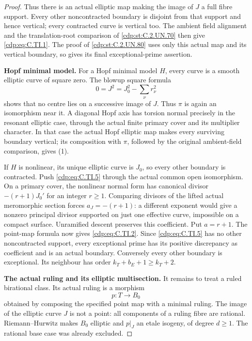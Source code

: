 \begin{proof}
Thus there is an actual elliptic map making
the image of \(J\) a full fibre support.
Every other noncontracted boundary is disjoint
from that support and hence vertical; every
contracted curve is vertical too. The ambient
field alignment and the translation-root
comparison of \ref{cdp:st:C.2.UN.70} then give \eqref{cdp:eq:C.TI.1}.
The proof of \ref{cdp:st:C.2.UN.80} uses only this actual map
and its vertical boundary, so gives its final
exceptional-prime assertion.

\par\medskip\noindent\textbf{Hopf minimal model.}
For a Hopf minimal model \(H\), every curve
is a smooth elliptic curve of square zero.
The blowup square formula
\[
                  0=J^2=J_0^2-\sum_\nu r_\nu^2
 \tag{C.TI.8}\label{cdp:eq:C.TI.8}
\]
shows that no centre lies on a successive
image of \(J\). Thus \(\pi\) is again an
isomorphism near it. A diagonal Hopf axis
has torsion normal precisely in the resonant
elliptic case, through the actual finite
primary cover and its multiplier character.
In that case the actual Hopf elliptic map
makes every surviving boundary vertical;
its composition with \(\pi\), followed by
the original ambient-field comparison,
gives (1).

If \(H\) is nonlinear, its unique elliptic
curve is \(J_0\), so every other boundary
is contracted. Push \eqref{cdp:eq:C.TI.5} through the
actual common open isomorphism. On a
primary cover, the nonlinear normal form
has canonical divisor \(-(r+1)J_0'\) for
an integer \(r\ge1\). Comparing divisors
of the lifted actual meromorphic section
forces \(a_J=-(r+1)\): a different exponent
would give a nonzero principal divisor
supported on just one effective curve,
impossible on a compact surface. Unramified
descent preserves this coefficient. Put
\(a=r+1\). The point-map formula now gives
\eqref{cdp:eq:C.TI.2}. Since \eqref{cdp:eq:C.TI.5} has no other
noncontracted support, every exceptional
prime has its positive discrepancy as
coefficient and is an actual boundary.
Conversely every other boundary is
exceptional. Its neighbour has order
\(k_T+b_E+1\ge k_T+2\).

\par\medskip\noindent\textbf{The actual ruling and its elliptic multisection.}
It remains to treat a ruled birational
class. Its actual ruling is a morphism
\[
                       p:T\longrightarrow B_0
 \tag{C.TI.9}\label{cdp:eq:C.TI.9}
\]
obtained by composing the specified point
map with a minimal ruling. The image of
the elliptic curve \(J\) is not a point:
all components of a ruling fibre are
rational. Riemann--Hurwitz makes \(B_0\)
elliptic and \(p|_J\) an etale isogeny,
of degree \(d\ge1\). The rational base
case was already excluded.


\end{proof}
